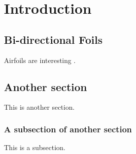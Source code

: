 \chapter{Introduction}

\section{Bi-directional Foils}

Airfoils are interesting \cite{Abbott1959}.



\section{Another section}

This is another section.


\subsection{A subsection of another section}

This is a subsection.
